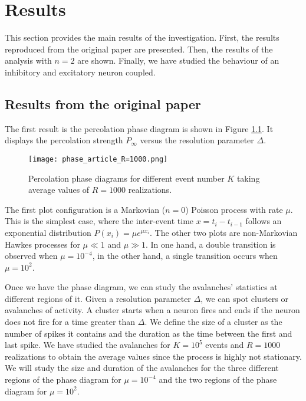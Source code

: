 \chapter{Results}

This section provides the main results of the investigation. First, the results reproduced from the original paper \cite{notarmuzi2021percolation} are presented. Then, the results of
the analysis with $n=2$ are shown. Finally, we have studied the behaviour of an inhibitory and excitatory neuron coupled.

\section{Results from the original paper}

The first result is the percolation phase diagram is shown in Figure \ref{f:phase_diagram_article}. It displays the percolation strength $P_{\infty}$ versus the resolution parameter $\Delta$.

\begin{figure}[H]
    \centering
    \texttt{[image: phase\_article\_R=1000.png]}
    \caption{Percolation phase diagrams for different event number $K$ taking average values of $R=1000$ realizations.}
    \label{f:phase_diagram_article}
\end{figure}

The first plot configuration is a Markovian ($n=0$) Poisson process with rate $\mu$. This is the simplest case, where the inter-event time $x=t_i-t_{i-1}$ follows an exponential 
distribution $P(x_i)=\mu e^{\mu x_i}$. The other two plots are non-Markovian Hawkes processes for $\mu \ll 1$ and $\mu\gg 1$. In one hand, a double transition is observed when 
$\mu = 10^{-4}$, in the other hand, a single transition occurs when $\mu = 10^2$. 

Once we have the phase diagram, we can study the avalanches' statistics at different regions of it. Given a resolution parameter $\Delta$, we can spot clusters or avalanches of activity.
A cluster starts when a neuron fires and ends if the neuron does not fire for a time greater than $\Delta$. We define the size of a cluster as the number of spikes it contains and the duration
as the time between the first and last spike. We have studied the avalanches for $K=10^5$ events and $R=1000$ realizations to obtain the average values since the process is highly not 
stationary. We will study the size and duration of the avalanches for the three different regions of the phase diagram for $\mu=10^{-4}$ and the two regions of the phase diagram for $\mu=10^2$.



